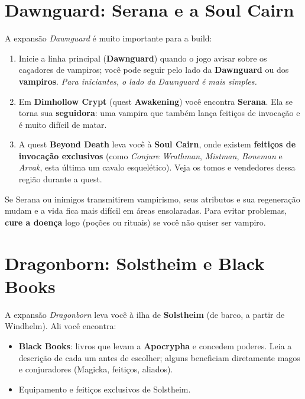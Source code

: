 \documentclass[11pt,a4paper,oneside,openany]{book}
\newcommand{\magia}[1]{\textit{\textcolor{SoulCairnPurple}{#1}}}
\newcommand{\quest}[1]{\textsf{\textbf{\textcolor{NecroEmerald}{#1}}}}
\newcommand{\lugar}[1]{\textbf{\textcolor{ImperialGold!75!black}{#1}}}
\newcommand{\npc}[1]{\textbf{#1}}
\begin{document}
\section{Dawnguard: Serana e a Soul Cairn}
A expansão \emph{Dawnguard} é muito importante para a build:
\begin{enumerate}
  \item Inicie a linha principal (\quest{Dawnguard}) quando o jogo avisar sobre os caçadores de vampiros; você pode seguir pelo lado da \textbf{Dawnguard} ou dos \textbf{vampiros}. \emph{Para iniciantes, o lado da Dawnguard é mais simples.}
  \item Em \lugar{Dimhollow Crypt} (quest \quest{Awakening}) você encontra \npc{Serana}. Ela se torna sua \textbf{seguidora}: uma vampira que também lança feitiços de invocação e é muito difícil de matar.
  \item A quest \quest{Beyond Death} leva você à \lugar{Soul Cairn}, onde existem \textbf{feitiços de invocação exclusivos} (como \magia{Conjure Wrathman}, \magia{Mistman}, \magia{Boneman} e \magia{Arvak}, esta última um cavalo esquelético). Veja os tomos e vendedores dessa região durante a quest.
\end{enumerate}

\begin{alerta}[Vampirismo]
Se Serana ou inimigos transmitirem vampirismo, seus atributos e sua regeneração mudam e a vida fica mais difícil em áreas ensolaradas. Para evitar problemas, \textbf{cure a doença} logo (poções ou rituais) se você não quiser ser vampiro.
\end{alerta}

\section{Dragonborn: Solstheim e Black Books}
A expansão \emph{Dragonborn} leva você à ilha de \lugar{Solstheim} (de barco, a partir de Windhelm). Ali você encontra:
\begin{itemize}
  \item \textbf{Black Books}: livros que levam a \lugar{Apocrypha} e concedem poderes. Leia a descrição de cada um antes de escolher; alguns beneficiam diretamente magos e conjuradores (Magicka, feitiços, aliados).
  \item Equipamento e feitiços exclusivos de Solstheim.
\end{itemize}
\end{document}
